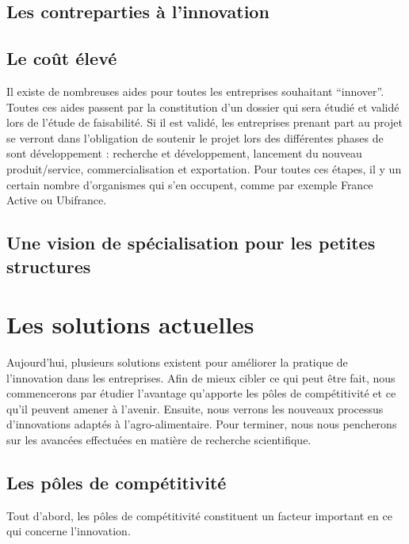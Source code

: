 \documentclass[a4paper,12pt]{report}
\begin{document}
		\subsection{Les contreparties à l'innovation}
			
		\subsection{Le coût élevé}
		Il existe de nombreuses aides pour toutes les entreprises souhaitant “innover”. Toutes ces aides passent par la constitution d’un dossier qui sera étudié et validé lors de l’étude de faisabilité. Si il est validé, les entreprises prenant part au projet se verront dans l’obligation de soutenir le projet lors des différentes phases de sont développement : recherche et développement, lancement du nouveau produit/service, commercialisation et exportation. Pour toutes ces étapes, il y un certain nombre d’organismes qui s’en occupent, comme par exemple France Active ou Ubifrance\cite{AidesInnovation}. 
				
		\subsection{Une vision de spécialisation pour les petites structures}
			
	\section{Les solutions actuelles}
		Aujourd’hui, plusieurs solutions existent pour améliorer la pratique de l’innovation dans les entreprises. Afin de mieux cibler ce qui peut être fait, nous commencerons par étudier l’avantage qu’apporte les pôles de compétitivité et ce qu’il peuvent amener à l’avenir. Ensuite, nous verrons les nouveaux processus d’innovations adaptés à l’agro-alimentaire. Pour terminer, nous nous pencherons sur les avancées effectuées en matière de recherche scientifique.
		
		\subsection{Les pôles de compétitivité}
		Tout d’abord, les pôles de compétitivité constituent un facteur important en ce qui concerne l’innovation.
		
\end{document}
